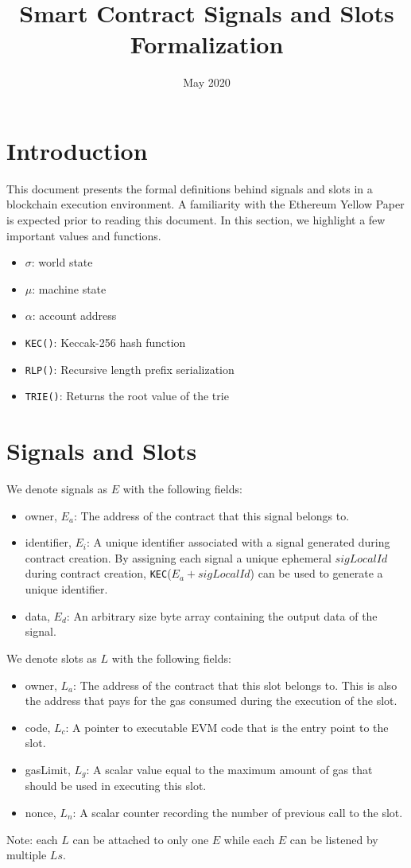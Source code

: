 \documentclass{article}
\title{Smart Contract Signals and Slots Formalization}
\date{May 2020}
\begin{document}
\maketitle


\section{Introduction}
This document presents the formal definitions behind signals and slots in a blockchain execution environment. A familiarity with the Ethereum Yellow Paper is expected prior to reading this document. In this section, we highlight a few important values and functions.
\begin{itemize}
    \item $\sigma$: world state
    \item $\mu$: machine state
    \item $\alpha$: account address
    \item \texttt{KEC()}: Keccak-256 hash function
    \item \texttt{RLP()}: Recursive length prefix serialization
    \item \texttt{TRIE()}: Returns the root value of the trie 
\end{itemize}


\section{Signals and Slots}
We denote signals as $E$ with the following fields:
\begin{itemize}
    \item owner, $E_a$: The address of the contract that this signal belongs to.
    \item identifier, $E_{i}$: A unique identifier associated with a signal generated during contract creation. By assigning each signal a unique ephemeral $sigLocalId$ during contract creation, \texttt{KEC}($E_a + sigLocalId$) can be used to generate a unique identifier.
    \item data, $E_d$: An arbitrary size byte array containing the output data of the signal.
\end{itemize}
We denote slots as $L$ with the following fields:
\begin{itemize}
    \item owner, $L_a$: The address of the contract that this slot belongs to. This is also the address that pays for the gas consumed during the execution of the slot.
    \item code, $L_c$: A pointer to executable EVM code that is the entry point to the slot.
    \item gasLimit, $L_g$: A scalar value equal to the maximum amount of gas that should be used in executing this slot.
    \item nonce, $L_n$: A scalar counter recording the number of previous call to the slot. 
\end{itemize}
Note: each $L$ can be attached to only one $E$ while each $E$ can be listened by multiple $Ls$.  
    
\end{document}

